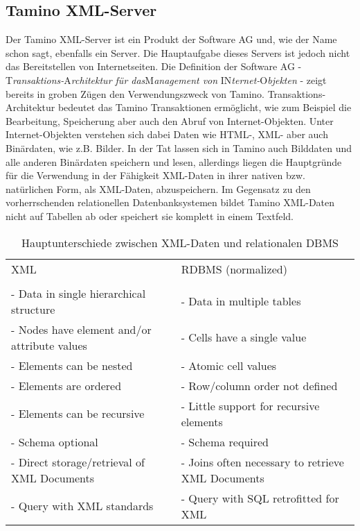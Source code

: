 \subsection{Tamino XML-Server}
Der Tamino XML-Server ist ein Produkt der Software AG und, wie der Name schon sagt, ebenfalls ein Server.
Die Hauptaufgabe dieses Servers ist jedoch nicht das Bereitstellen von Internetseiten. Die Definition der 
Software AG - T{\it ransaktions-}A{\it rchitektur f\"ur das}M{\it anagement von} IN{\it ternet-}O{\it bjekten}
- zeigt bereits in groben Z\"ugen den Verwendungszweck von Tamino. Transaktions-Architektur bedeutet das
Tamino Transaktionen erm\"oglicht, wie zum Beispiel die Bearbeitung, Speicherung aber auch den Abruf von 
Internet-Objekten. Unter Internet-Objekten verstehen sich dabei Daten wie HTML-, XML- aber auch Bin\"ardaten, 
wie z.B. Bilder. In der Tat lassen sich in Tamino auch Bilddaten und alle anderen Bin\"ardaten speichern
und lesen, allerdings liegen die Hauptgr\"unde f\"ur die Verwendung in der F\"ahigkeit XML-Daten in ihrer
nativen bzw. nat\"urlichen Form, als XML-Daten, abzuspeichern. Im Gegensatz zu den vorherrschenden relationellen
Datenbanksystemen bildet Tamino XML-Daten nicht auf Tabellen ab oder speichert sie komplett in einem Textfeld.

\begin{table}[h]
\begin{tabular}{|l|l|}
\hline
XML & RDBMS (normalized)\\&\\
- Data in single hierarchical structure      & - Data in multiple tables\\
- Nodes have element and/or attribute values & - Cells have a single value\\
- Elements can be nested                     & - Atomic cell values\\
- Elements are ordered                       & - Row/column order not defined\\
- Elements can be recursive                  & - Little support for recursive elements\\
- Schema optional                            & - Schema required\\
- Direct storage/retrieval of XML Documents  & - Joins often necessary to retrieve XML Documents\\
- Query with XML standards                   & - Query with SQL retrofitted for XML\\
\hline
\end{tabular}
\caption{Hauptunterschiede zwischen XML-Daten und relationalen DBMS \cite[S.~9]{tamino_01}}
\end{table}

